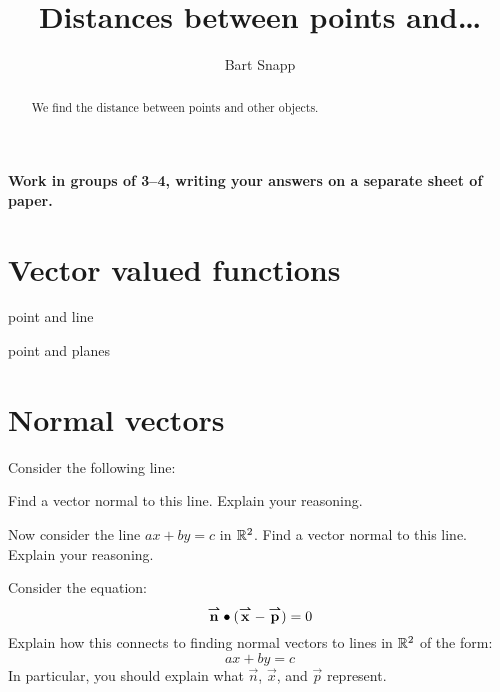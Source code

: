 \documentclass{ximera}
\author{Bart Snapp}
\title[Collaborate:]{Distances between points and\dots}
\begin{document}
\begin{abstract}
  We find the distance between points and other objects.
\end{abstract}
\maketitle

\textbf{Work in groups of 3--4, writing your answers on a separate
  sheet of paper.}


\section{Vector valued functions}



point and line


point and planes




\section{Normal vectors}

\begin{problem}
Consider the following line:
\begin{image}
\end{image}
Find a vector normal to this line. Explain your reasoning.
\end{problem}

\begin{problem}
  Now consider the line $ax+by = c$ in $\mathbb R^2$. Find a vector normal to
  this line. Explain your reasoning.
\end{problem}

\begin{problem}
  Consider the equation:
  \[
  {\overset{\boldsymbol{\rightharpoonup}}{\mathbf{n}}}\bullet ({\overset{\boldsymbol{\rightharpoonup}}{\mathbf{x}}}-{\overset{\boldsymbol{\rightharpoonup}}{\mathbf{p}}}) = 0
  \]
  Explain how this connects to finding normal vectors to lines in
  $\mathbb R^2$ of the form:
  \[
  ax + by = c
  \]
  In particular, you should explain what $\vec{n}$, $\vec{x}$, and
  $\vec{p}$ represent.
\end{problem}
\end{document}
